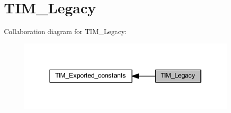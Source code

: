 \hypertarget{group___t_i_m___legacy}{}\section{T\+I\+M\+\_\+\+Legacy}
\label{group___t_i_m___legacy}
Collaboration diagram for T\+I\+M\+\_\+\+Legacy\+:\nopagebreak
\begin{figure}[H]
\begin{center}
\leavevmode
\includegraphics[width=310pt]{group___t_i_m___legacy}
\end{center}
\end{figure}
